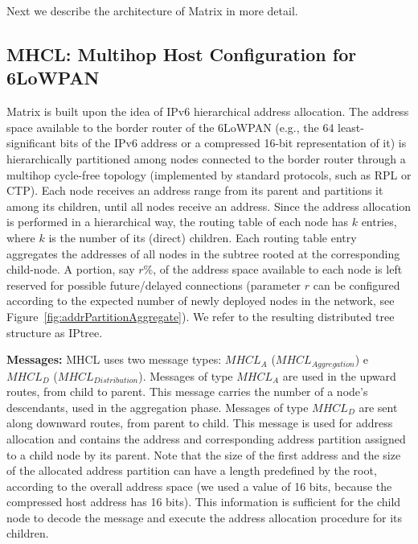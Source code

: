 Next we describe the architecture of Matrix in more detail.

\subsection{MHCL: Multihop Host Configuration for 6LoWPAN}
\label{subsec:mhcl}

Matrix is built upon the idea of IPv6 hierarchical address allocation. The address space available to the border router of the 6LoWPAN (e.g., the 64 least-significant bits of the IPv6 address or a compressed 16-bit representation of it) is hierarchically partitioned among nodes connected to the border router through a multihop cycle-free topology (implemented by standard protocols, such as RPL or CTP). Each node receives an address range from its parent and partitions it among its children, until all nodes receive an address. Since the address allocation is performed in a hierarchical way, the routing table of each node has $k$ entries, where $k$ is the number of its (direct) children. Each routing table entry aggregates the addresses of all nodes in the subtree rooted at the corresponding child-node. A portion, say $r\%$, of the address space available to each node is left reserved for possible future/delayed connections (parameter $r$ can be configured according to the expected number of newly deployed nodes in the network, see Figure~\ref{fig:addrPartitionAggregate}). We refer to the resulting distributed tree structure as IPtree.


\textbf{Messages:} MHCL uses two message types: $MHCL_{A}$ ($MHCL_{Aggregation}$) e $MHCL_{D}$ ($MHCL_{Distribution}$). 
Messages of type $MHCL_{A}$ are used in the upward routes, from child to parent. This message carries the number of a node's descendants, used in the aggregation phase. Messages of type $MHCL_{D}$ are sent along downward routes, from parent to child. This message is used for address allocation and contains the address and corresponding address partition assigned to a child node by its parent. Note that the size of the first address and the size of the allocated address partition can have a length predefined by the root, according to the overall address space (we used a value of 16 bits, because the compressed host address has 16 bits). This information is sufficient for the child node to decode the message and execute the address allocation procedure for its children.


